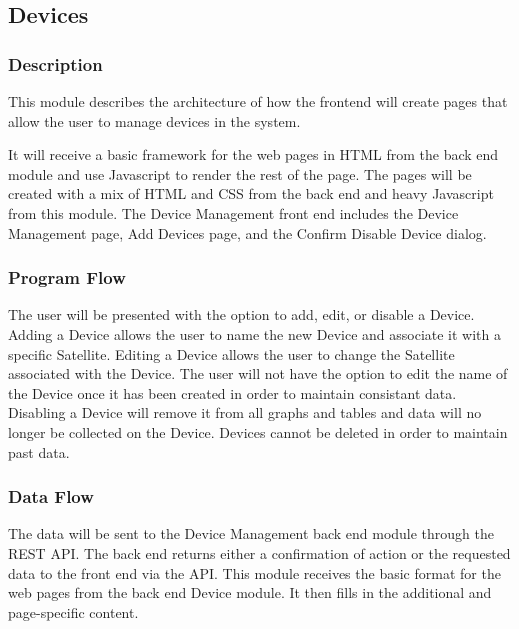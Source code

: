 
\subsection{Devices}

\subsubsection{Description}

This module describes the architecture of how the frontend will create pages that allow the user to manage devices in the system. 

It will receive a basic framework for the web pages in HTML from the back end module and use Javascript to render the rest of the page. 
The pages will be created with a mix of HTML and CSS from the back end and heavy Javascript from this module. 
The Device Management front end includes the Device Management page, Add Devices page, and the Confirm Disable Device dialog. 


\subsubsection{Program Flow}

The user will be presented with the option to add, edit, or disable a Device. 
Adding a Device allows the user to name the new Device and associate it with a specific Satellite. 
Editing a Device allows the user to change the Satellite associated with the Device. 
The user will not have the option to edit the name of the Device once it has been created in order to maintain consistant data. 
Disabling a Device will remove it from all graphs and tables and data will no longer be collected on the Device.
Devices cannot be deleted in order to maintain past data.

\subsubsection{Data Flow}

The data will be sent to the Device Management back end module through the REST API. 
The back end returns either a confirmation of action or the requested data to the front end via the API. 
This module receives the basic format for the web pages from the back end Device module. 
It then fills in the additional and page-specific content. 


